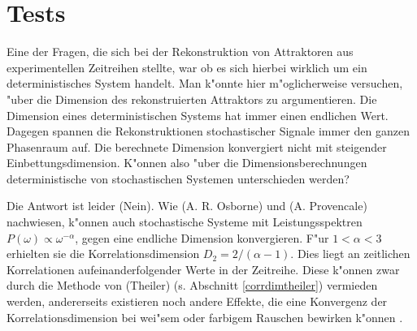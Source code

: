 \clearpage
\section{Tests}
Eine der Fragen, die sich bei der Rekonstruktion von Attraktoren aus experimentellen
Zeitreihen stellte, war ob es sich hierbei wirklich um ein deterministisches System
handelt.  Man k"onnte hier m"oglicherweise versuchen, "uber die Dimension des
rekonstruierten Attraktors zu argumentieren. Die Dimension eines deterministischen
Systems hat immer einen endlichen Wert. Dagegen spannen die Rekonstruktionen
stochastischer Signale immer den ganzen Phasenraum auf. Die berechnete Dimension
konvergiert nicht mit steigender Einbettungsdimension. K"onnen also "uber die
Dimensionsberechnungen deterministische von stochastischen Systemen unterschieden werden?

Die Antwort ist leider \naja(Nein). Wie \autor(A. R. Osborne) und \autor(A. Provencale)
nachwiesen, k"onnen auch stochastische Systeme mit Leistungsspektren
$P(\omega)\propto\omega^{-\alpha}$, gegen eine endliche Dimension
konvergieren\cite{Osborne89a}. F"ur $1<\alpha<3$ erhielten sie die Korrelationsdimension $D_2=2/(\alpha-1)$.  Dies
liegt an zeitlichen Korrelationen aufeinanderfolgender Werte in der Zeitreihe. Diese
k"onnen zwar durch die Methode von \autor(Theiler) (s. Abschnitt \ref{corrdimtheiler})
vermieden werden, andererseits existieren noch andere Effekte, die eine Konvergenz der
Korrelationsdimension bei wei"sem oder farbigem Rauschen bewirken k"onnen \cite{Kennel92b}.


